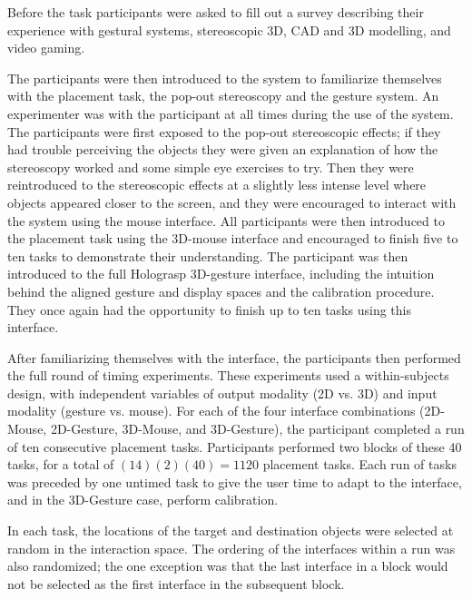\documentclass[pageno]{jpaper}
\begin{document}
Before the task participants were asked to fill out a survey describing their experience with
gestural systems, stereoscopic 3D, CAD and 3D modelling, and video gaming.

The participants were then introduced to the system to familiarize themselves with the placement task, the pop-out
stereoscopy and the gesture system. An experimenter was with the participant at all times during
the use of the system. The participants were first exposed to the pop-out stereoscopic effects;
if they had trouble perceiving the objects they were given an explanation of how the stereoscopy
worked and some simple eye exercises to try. Then they were reintroduced to the stereoscopic effects
at a slightly less intense level where objects appeared closer to the screen, and they were encouraged
to interact with the system using the mouse interface. All participants were then introduced to the placement
task using the 3D-mouse interface and encouraged to finish five to ten tasks to demonstrate their understanding.
The participant was then introduced to the full Holograsp 3D-gesture interface, including the intuition behind the aligned gesture and display
spaces and the calibration procedure. They once again had the opportunity to finish up to ten tasks using this interface.

After familiarizing themselves with the interface, the participants then performed the full round of timing experiments. These
experiments used a within-subjects design, with independent variables of output modality (2D vs. 3D) and input modality (gesture vs. mouse).
For each of the four interface combinations (2D-Mouse, 2D-Gesture, 3D-Mouse, and 3D-Gesture), the participant completed a
run of ten consecutive placement tasks. Participants performed two blocks of these 40 tasks, for a total of $(14)(2)(40) = 1120$
placement tasks. Each run of tasks was preceded by one untimed task to give the user time to adapt to the interface, and
in the 3D-Gesture case, perform calibration.

In each task, the locations of the target and destination objects were selected at random in the interaction space. The
ordering of the interfaces within a run was also randomized; the one exception was that the last interface in a block
would not be selected as the first interface in the subsequent block.
\end{document}
